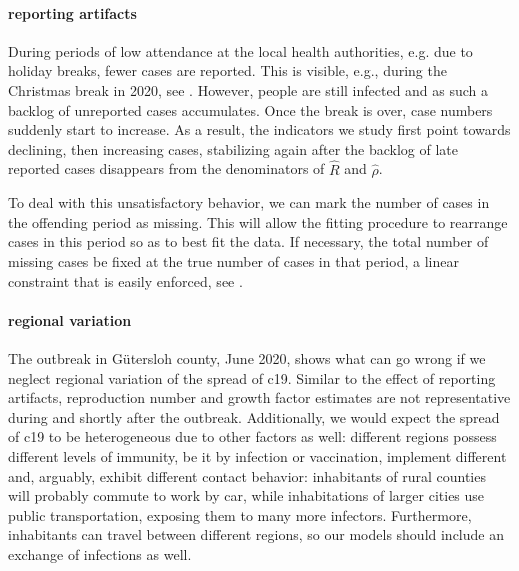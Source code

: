 \paragraph{reporting artifacts}
During periods of low attendance at the local health authorities, e.g. due to holiday breaks, fewer cases are reported. This is visible, e.g., during the Christmas break in 2020, see . However, people are still infected and as such a backlog of unreported cases accumulates. Once the break is over, case numbers suddenly start to increase. As a result, the indicators we study first point towards declining, then increasing cases, stabilizing again after the backlog of late reported cases disappears from the denominators of $\hat R$ and $\hat \rho$. 

To deal with this unsatisfactory behavior, we can mark the number of cases in the offending period as missing. This will allow the fitting procedure to rearrange cases in this period so as to best fit the data. If necessary, the total number of missing cases be fixed at the true number of cases in that period, a linear constraint that is easily enforced, see .
\bigskip


\paragraph{regional variation}
The outbreak in Gütersloh county, June 2020, shows what can go wrong if we neglect regional variation of the spread of \acrshort{c19}. Similar to the effect of reporting artifacts, reproduction number and growth factor estimates are  not representative during and shortly after the outbreak. Additionally, we would expect the spread of \acrshort{c19} to be heterogeneous due to other factors as well: different regions possess different levels of immunity, be it by infection or vaccination, implement different  and, arguably, exhibit different contact behavior: inhabitants of rural counties will probably commute to work by car, while inhabitations of larger cities use public transportation, exposing them to many more infectors. Furthermore, inhabitants can travel between different regions, so our models should include an exchange of infections as well. 


